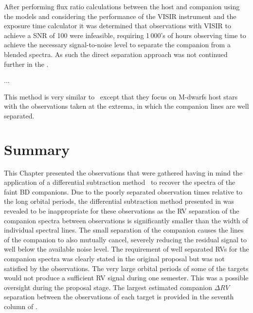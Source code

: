 After performing flux ratio calculations between the host and companion using the \citet{barrafe_evolution_2003} models and considering the performance of the {VISIR} instrument and the exposure time calculator it was determined that observations with {VISIR} to achieve a {SNR} of 100 were infeasible, requiring 1\,000's of hours observing time to achieve the necessary signal-to-noise level to separate the companion from a blended spectra. As such the direct separation approach was not continued further in the \mir{}.



...

This method is very similar to~\citet{kostogryz_spectral_2013} except that they focus on M-dwarfs host stars with the observations taken at the extrema, in which the companion lines are well separated. 

\section{Summary}
This Chapter  presented the observations that were gathered having in mind the application of a differential subtraction method~\citep[e.g.,][]{ferluga_separating_1997, kostogryz_spectral_2013} to recover the spectra of the faint {BD} companions.  Due to the poorly separated observation times relative to the long orbital periods, the differential subtraction method presented in  was revealed to be inappropriate for these observations as the {RV} separation of the companion spectra between observations is significantly smaller than the width of individual spectral lines. The small separation of the companion causes the lines of the companion to also mutually cancel, severely reducing the residual signal to well below the available noise level. The requirement of well separated RVs for the companion spectra was clearly stated in the original proposal but was not satisfied by the observations. {\red{} The very large orbital periods of some of the targets would not produce a sufficient {RV} signal during one semester. This was a possible oversight during the proposal stage.} The largest estimated companion \(\Delta {RV}\) separation between the observations of each target is provided in the seventh column of . 
